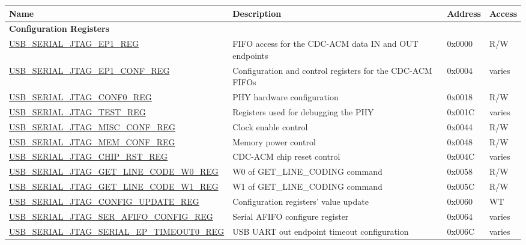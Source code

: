 \begin{longtable}{ | p{7.3cm} | p{5.7cm} | p{1.2cm} | p{1.5cm} | }
    \hline\rowcolor{lightgray}
    \textbf{Name} & \textbf{Description} &  \textbf{Address} & \textbf{Access} \\ \hline
    \endhead
    \multicolumn{4}{|l|}{\textbf{Configuration Registers}} \\ \hline
    \hyperref[regdesc:USBSERIALJTAGEP1REG]{USB\_SERIAL\_JTAG\_EP1\_REG} & FIFO access for the CDC-ACM data IN and OUT endpoints & 0x0000 & R/W \\ \hline
    \hyperref[regdesc:USBSERIALJTAGEP1CONFREG]{USB\_SERIAL\_JTAG\_EP1\_CONF\_REG} & Configuration and control registers for the CDC-ACM FIFOs & 0x0004 & varies \\ \hline
    \hyperref[regdesc:USBSERIALJTAGCONF0REG]{USB\_SERIAL\_JTAG\_CONF0\_REG} & PHY hardware configuration & 0x0018 & R/W \\ \hline
    \hyperref[regdesc:USBSERIALJTAGTESTREG]{USB\_SERIAL\_JTAG\_TEST\_REG} & Registers used for debugging the PHY & 0x001C & varies \\ \hline
    \hyperref[regdesc:USBSERIALJTAGMISCCONFREG]{USB\_SERIAL\_JTAG\_MISC\_CONF\_REG} & Clock enable control & 0x0044 & R/W \\ \hline
    \hyperref[regdesc:USBSERIALJTAGMEMCONFREG]{USB\_SERIAL\_JTAG\_MEM\_CONF\_REG} & Memory power control & 0x0048 & R/W \\ \hline
    \hyperref[regdesc:USBSERIALJTAGCHIPRSTREG]{USB\_SERIAL\_JTAG\_CHIP\_RST\_REG} & CDC-ACM chip reset control & 0x004C & varies \\ \hline
    \hyperref[regdesc:USBSERIALJTAGGETLINECODEW0REG]{USB\_SERIAL\_JTAG\_GET\_LINE\_CODE\_W0\_REG} & W0 of GET\_LINE\_CODING command & 0x0058 & R/W \\ \hline
    \hyperref[regdesc:USBSERIALJTAGGETLINECODEW1REG]{USB\_SERIAL\_JTAG\_GET\_LINE\_CODE\_W1\_REG} & W1 of GET\_LINE\_CODING command & 0x005C & R/W \\ \hline
    \hyperref[regdesc:USBSERIALJTAGCONFIGUPDATEREG]{USB\_SERIAL\_JTAG\_CONFIG\_UPDATE\_REG} & Configuration registers' value update & 0x0060 & WT \\ \hline
    \hyperref[regdesc:USBSERIALJTAGSERAFIFOCONFIGREG]{USB\_SERIAL\_JTAG\_SER\_AFIFO\_CONFIG\_REG} & Serial AFIFO configure register & 0x0064 & varies \\ \hline
    \hyperref[regdesc:USBSERIALJTAGSERIALEPTIMEOUT0REG]{USB\_SERIAL\_JTAG\_SERIAL\_EP\_TIMEOUT0\_REG} & USB UART out endpoint timeout configuration & 0x006C & varies \\ \hline

\end{longtable}
